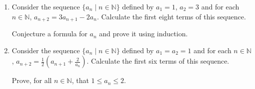 \documentclass[12pt]{article}
\newcommand{\NN}{{\mathbb N}}  %
\begin{document}
\begin{enumerate}
 \item{} Consider the sequence $\{a_n\mid n\in\NN\}$  defined by $a_1=1$, $a_2=3$ and for each $n\in \NN$,
           $a_{n+2}=3 a_{n+1}-2a_n$.
   Calculate the first eight terms of this sequence. 

   Conjecture a formula for $a_n$ and prove it using induction.

 \item{} Consider the sequence $\{a_n\mid n\in\NN\}$  defined by $a_1=a_2=1$ and for each $n\in \NN$,
           $a_{n+2}=\frac{1}{2}\left(a_{n+1}+\frac{2}{a_n}\right)$.
   Calculate the first six terms of this sequence.

   Prove, for all $n\in\NN$, that $1\leq a_n\leq 2$.
  
\end{enumerate}
\end{document}
